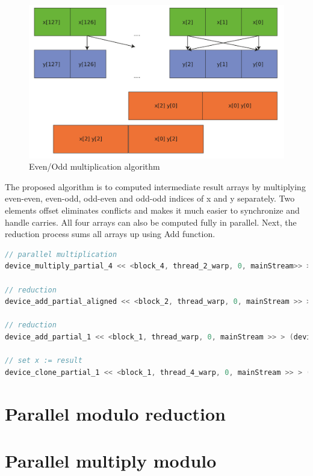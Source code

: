 \documentclass[oneside,openright,12pt,final,en]{mgr}
\begin{document}
\begin{figure}[H]
	\centering
	\includegraphics[width=\textwidth]{all_mull}
	\caption{Even/Odd multiplication algorithm}
	\label{fig:al_mull}
\end{figure}

The proposed algorithm is to computed intermediate result arrays by multiplying even-even, even-odd, odd-even and odd-odd indices of x and y separately. Two elements offset eliminates conflicts and makes it much easier to synchronize and handle carries. All four arrays can also be computed fully in parallel. Next, the reduction process sums all arrays up using Add function.

\begin{lstlisting}[language=cpp]
// parallel multiplication
device_multiply_partial_4 << <block_4, thread_2_warp, 0, mainStream>> > (device4arrays, device_x, device_y);

// reduction
device_add_partial_aligned << <block_2, thread_warp, 0, mainStream >> > (device4arrays, device4arrays + 2 * 128);

// reduction	
device_add_partial_1 << <block_1, thread_warp, 0, mainStream >> > (device4arrays, device4arrays + 128);

// set x := result
device_clone_partial_1 << <block_1, thread_4_warp, 0, mainStream >> > (device_x, device4arrays);
\end{lstlisting}
 

\section{Parallel modulo reduction}
\section{Parallel multiply modulo}
\end{document}
